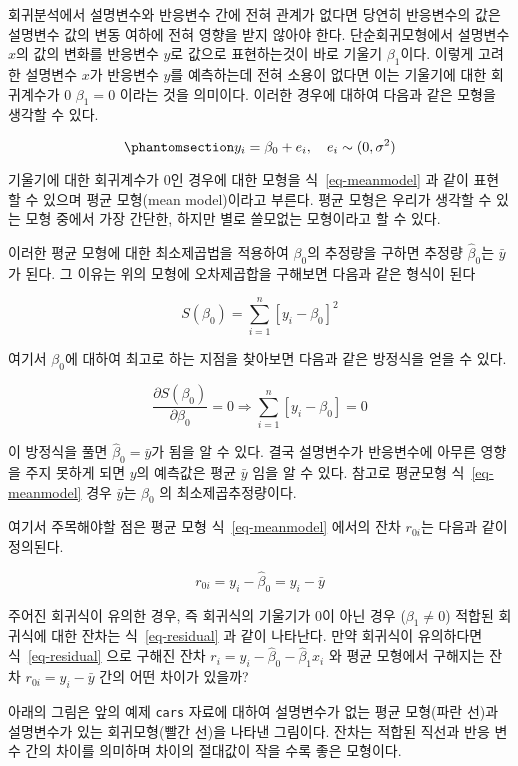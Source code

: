 \documentclass[
  11pt,
  a4paper,
  oneside]{scrbook}
\theoremstyle{definition}
\theoremstyle{plain}
\theoremstyle{definition}
\theoremstyle{definition}
\theoremstyle{remark}
\begin{document}
회귀분석에서 설명변수와 반응변수 간에 전혀 관계가 없다면 당연히
반응변수의 값은 설명변수 값의 변동 여하에 전혀 영향을 받지 않아야 한다.
단순회귀모형에서 설명변수 \(x\)의 값의 변화를 반응변수 \(y\)로 값으로
표현하는것이 바로 기울기 \(\beta_1\)이다. 이렇게 고려한 설명변수 \(x\)가
반응변수 \(y\)를 예측하는데 전혀 소용이 없다면 이는 기울기에 대한
회귀계수가 0 \(\beta_1=0\) 이라는 것을 의미이다. 이러한 경우에 대하여
다음과 같은 모형을 생각할 수 있다.

\begin{equation}\phantomsection\label{eq-meanmodel}{
y_i = \beta_0 +e_i, \quad e_i \sim (0,\sigma^2) 
}\end{equation}

기울기에 대한 회귀계수가 0인 경우에 대한 모형을 식~\ref{eq-meanmodel} 과
같이 표현할 수 있으며 평균 모형(mean model)이라고 부른다. 평균 모형은
우리가 생각할 수 있는 모형 중에서 가장 간단한, 하지만 별로 쓸모없는
모형이라고 할 수 있다.

이러한 평균 모형에 대한 최소제곱법을 적용하여 \(\beta_0\)의 추정량을
구하면 추정량 \(\hat \beta_0\)는 \(\bar y\)가 된다. 그 이유는 위의
모형에 오차제곱합을 구해보면 다음과 같은 형식이 된다

\[ S(\beta_0)=  \sum^n_{i=1}[y_i-\beta_0]^2 \]

여기서 \(\beta_0\)에 대하여 최고로 하는 지점을 찾아보면 다음과 같은
방정식을 얻을 수 있다.

\[ 
\frac{\partial S(\beta_0)}{\partial \beta_0}  = 0  \Rightarrow  \sum^n_{i=1}[y_i - \beta_0] = 0 
\]

이 방정식을 풀면 \(\hat \beta_0 = \bar y\)가 됨을 알 수 있다. 결국
설명변수가 반응변수에 아무른 영향을 주지 못하게 되면 \(y\)의 예측값은
평균 \(\bar y\) 임을 알 수 있다. 참고로 평균모형 식~\ref{eq-meanmodel}
경우 \(\bar y\)는 \(\beta_0\) 의 최소제곱추정량이다.

여기서 주목해야할 점은 평균 모형 식~\ref{eq-meanmodel} 에서의 잔차
\(r_{0i}\)는 다음과 같이 정의된다.

\[ r_{0i} = y_i -\hat \beta_0 = y_i - \bar y \]

주어진 회귀식이 유의한 경우, 즉 회귀식의 기울기가 0이 아닌 경우
(\(\beta_1 \ne 0\)) 적합된 회귀식에 대한 잔차는 식~\ref{eq-residual} 과
같이 나타난다. 만약 회귀식이 유의하다면 식~\ref{eq-residual} 으로 구해진
잔차 \(r_i = y_i -\hat \beta_0 - \hat \beta_1 x_i\) 와 평균 모형에서
구해지는 잔차 \(r_{0i}  = y_i - \bar y\) 간의 어떤 차이가 있을까?

아래의 그림은 앞의 예제 \texttt{cars} 자료에 대하여 설명변수가 없는 평균
모형(파란 선)과 설명변수가 있는 회귀모형(빨간 선)을 나타낸 그림이다.
잔차는 적합된 직선과 반응 변수 간의 차이를 의미하며 차이의 절대값이 작을
수록 좋은 모형이다.
\end{document}
